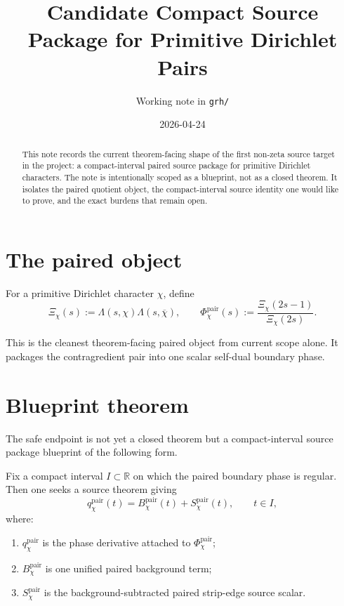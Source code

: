 \documentclass[11pt]{article}
\title{Candidate Compact Source Package for Primitive Dirichlet Pairs}
\author{Working note in \texttt{grh/}}
\date{2026-04-24}
\begin{document}
\maketitle

\begin{abstract}
This note records the current theorem-facing shape of the first non-zeta source
target in the project: a compact-interval paired source package for primitive
Dirichlet characters. The note is intentionally scoped as a blueprint, not as a
closed theorem. It isolates the paired quotient object, the compact-interval
source identity one would like to prove, and the exact burdens that remain open.
\end{abstract}

\section{The paired object}

For a primitive Dirichlet character \(\chi\), define
\[
\Xi_\chi(s):=\Lambda(s,\chi)\Lambda(s,\overline\chi),
\qquad
\Phi_\chi^{\mathrm{pair}}(s):=\frac{\Xi_\chi(2s-1)}{\Xi_\chi(2s)}.
\]

This is the cleanest theorem-facing paired object from current scope alone. It
packages the contragredient pair into one scalar self-dual boundary phase.

\section{Blueprint theorem}

The safe endpoint is not yet a closed theorem but a compact-interval source
package blueprint of the following form.

Fix a compact interval \(I\subset\mathbb R\) on which the paired boundary phase
is regular. Then one seeks a source theorem giving
\[
q_\chi^{\mathrm{pair}}(t)=B_\chi^{\mathrm{pair}}(t)+S_\chi^{\mathrm{pair}}(t),
\qquad t\in I,
\]
where:

\begin{enumerate}
\item \(q_\chi^{\mathrm{pair}}\) is the phase derivative attached to
\(\Phi_\chi^{\mathrm{pair}}\);
\item \(B_\chi^{\mathrm{pair}}\) is one unified paired background term;
\item \(S_\chi^{\mathrm{pair}}\) is the background-subtracted paired strip-edge
source scalar.
\end{enumerate}
\end{document}
